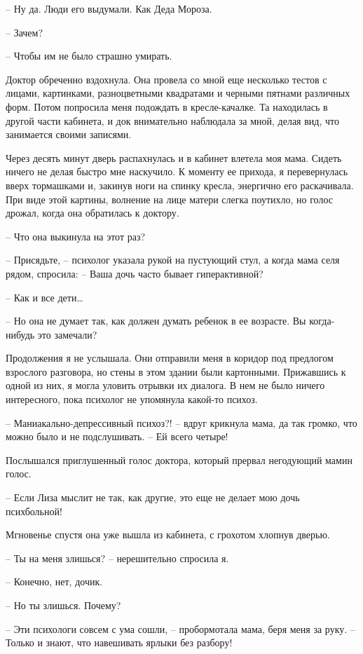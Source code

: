 \documentclass[
]{book}
\begin{document}
-- Ну да. Люди его выдумали. Как Деда Мороза.

-- Зачем?

-- Чтобы им не было страшно умирать.

Доктор обреченно вздохнула. Она провела со мной еще несколько тестов с лицами, картинками, разноцветными квадратами и черными пятнами различных форм. Потом попросила меня подождать в кресле-качалке. Та находилась в другой части кабинета, и док внимательно наблюдала за мной, делая вид, что занимается своими записями.

Через десять минут дверь распахнулась и в кабинет влетела моя мама. Сидеть ничего не делая быстро мне наскучило. К моменту ее прихода, я перевернулась вверх тормашками и, закинув ноги на спинку кресла, энергично его раскачивала. При виде этой картины, волнение на лице матери слегка поутихло, но голос дрожал, когда она обратилась к доктору.

-- Что она выкинула на этот раз?

-- Присядьте, -- психолог указала рукой на пустующий стул, а когда мама селя рядом, спросила: -- Ваша дочь часто бывает гиперактивной?

-- Как и все дети\ldots{}

-- Но она не думает так, как должен думать ребенок в ее возрасте. Вы когда-нибудь это замечали?

Продолжения я не услышала. Они отправили меня в коридор под предлогом взрослого разговора, но стены в этом здании были картонными. Прижавшись к одной из них, я могла уловить отрывки их диалога. В нем не было ничего интересного, пока психолог не упомянула какой-то психоз.

-- Маниакально-депрессивный психоз?! -- вдруг крикнула мама, да так громко, что можно было и не подслушивать. -- Ей всего четыре!

Послышался приглушенный голос доктора, который прервал негодующий мамин голос.

-- Если Лиза мыслит не так, как другие, это еще не делает мою дочь психбольной!

Мгновенье спустя она уже вышла из кабинета, с грохотом хлопнув дверью.

-- Ты на меня злишься? -- нерешительно спросила я.

-- Конечно, нет, дочик.

-- Но ты злишься. Почему?

-- Эти психологи совсем с ума сошли, -- пробормотала мама, беря меня за руку. -- Только и знают, что навешивать ярлыки без разбору!
\end{document}
